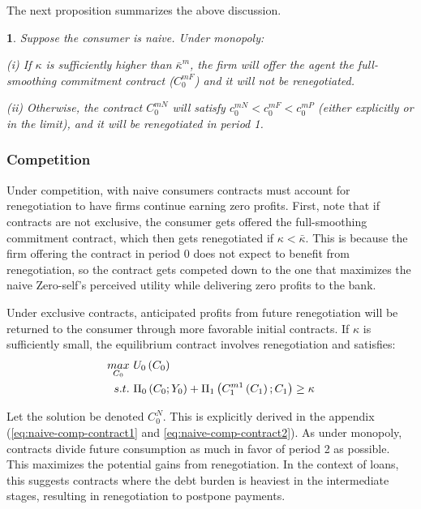 \documentclass[11pt,english]{article}
\theoremstyle{plain}
\newtheorem{prop}{\protect\propositionname}
\theoremstyle{definition}
\providecommand{\propositionname}{Proposition}
\begin{document}
The next proposition summarizes the above discussion. 
\begin{prop}
Suppose the consumer is naive. Under monopoly:

(i) If $\kappa$ is sufficiently higher than $\bar{\kappa}^{m}$,
the firm will offer the agent the full-smoothing commitment contract
($C_{0}^{mF}$) and it will not be renegotiated.

(ii) Otherwise, the contract $C_{0}^{mN}$ will satisfy $c_{0}^{mN}<c_{0}^{mF}<c_{0}^{mP}$
(either explicitly or in the limit), and it will be renegotiated in
period 1. 
\end{prop}

\subsubsection{Competition}

Under competition, with naive consumers contracts must account for
renegotiation to have firms continue earning zero profits. First,
note that if contracts are not exclusive, the consumer gets offered
the full-smoothing commitment contract, which then gets renegotiated
if $\kappa<\bar{\kappa}$. This is because the firm offering the contract
in period 0 does not expect to benefit from renegotiation, so the
contract gets competed down to the one that maximizes the naive Zero-self's
perceived utility while delivering zero profits to the bank.

Under exclusive contracts, anticipated profits from future renegotiation
will be returned to the consumer through more favorable initial contracts.
If $\kappa$ is sufficiently small, the equilibrium contract involves
renegotiation and satisfies: 
\begin{align}
\underset{C_{0}}{\mbox{\ensuremath{max}}} & \ U_{0}\left(C_{0}\right)\\
s.t. & \ \Pi_{0}\left(C_{0};Y_{0}\right)+\Pi_{1}\left(C_{1}^{m1}\left(C_{1}\right);C_{1}\right)\geq\kappa
\end{align}

Let the solution be denoted $C_{0}^{N}$. This is explicitly derived
in the appendix (\ref{eq:naive-comp-contract1} and \ref{eq:naive-comp-contract2}).
As under monopoly, contracts divide future consumption as much in
favor of period 2 as possible. This maximizes the potential gains
from renegotiation. In the context of loans, this suggests contracts
where the debt burden is heaviest in the intermediate stages, resulting
in renegotiation to postpone payments.
\end{document}
